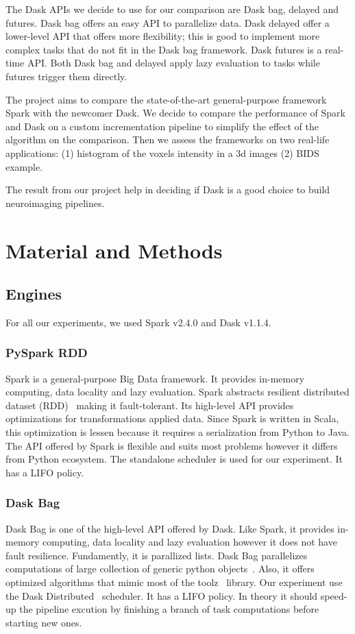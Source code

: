 \documentclass[conference]{IEEEtran}
\begin{document}
The Dask APIs we decide to use for our comparison are Dask bag, delayed and futures.
Dask bag offers an easy API to parallelize data. Dask delayed offer a lower-level API
that offers more flexibility; this is good to implement more complex tasks that do
not fit in the Dask bag framework. Dask futures is a real-time API. Both Dask bag and
delayed apply lazy evaluation to tasks while futures trigger them directly.

The project aims to compare the state-of-the-art general-purpose framework Spark with
the newcomer Dask. We decide to compare the performance of Spark and Dask on a custom
incrementation pipeline to simplify the effect of the algorithm on the comparison.
Then we assess the frameworks on two real-life applications: (1) histogram of the
voxels intensity in a 3d images (2) BIDS example.

The result from our project help in deciding if Dask is a good choice to build
neuroimaging pipelines.


\section{Material and Methods}

\subsection{Engines}
For all our experiments, we used Spark v2.4.0 and Dask v1.1.4.

\subsubsection{PySpark RDD~\cite{spark-rdd}} Spark is a general-purpose Big Data
framework. It provides in-memory computing, data locality and lazy evaluation. Spark
abstracts resilient distributed dataset (RDD)~\cite{RDD} making it fault-tolerant. Its
high-level API provides optimizations for transformations applied data. Since
Spark is written in Scala, this optimization is lessen because it requires a
serialization from Python to Java. The API offered by Spark is flexible and suits most
problems however it differs from Python ecosystem. The standalone scheduler is used for
our experiment. It has a LIFO policy.

\subsubsection{Dask Bag~\cite{dask-bag}} Dask Bag is one of the high-level API
offered by Dask. Like Spark, it provides in-memory computing, data locality and lazy
evaluation however it does not have fault resilience. Fundamently, it is parallized
lists. Dask Bag parallelizes computations of large collection of generic python
objects~\cite{dask-bag}. Also, it offers optimized algorithms that mimic most of the
toolz~\cite{toolz} library. Our experiment use the Dask Distributed~\cite{dask-distributed}
scheduler. It has a LIFO policy. In theory it should speed-up the pipeline excution
by finishing a branch of task computations before starting new ones.
\end{document}
